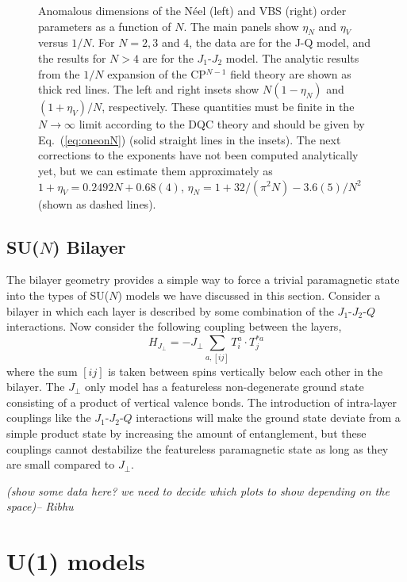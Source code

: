\documentclass[range]{ar2e}
\begin{document}
\begin{figure}
  \caption{ \label{fig:exp} Anomalous dimensions of the N\'eel (left)
    and VBS (right)
  order parameters as a function of $N$. The main panels show $\eta_N$ and $\eta_V$ versus $1/N$. For $N=2,3$ and $4$, the data are 
  for the J-Q model, and the results for $N>4$ are for the $J_1$-$J_2$ model. The analytic results 
  from the $1/N$ expansion of the CP$^{N-1}$ field theory are shown as thick red lines. The left and right insets 
  show $N(1-\eta_N)$ and $(1+\eta_V)/N$, respectively. These quantities must be finite in the  $N\rightarrow \infty$ 
  limit according to the DQC theory and should be given by Eq.~(\ref{eq:oneonN}) (solid straight lines in the insets). 
  The next corrections to the exponents have not been computed analytically yet, but we can estimate them approximately 
  as $1+\eta_V = 0.2492 N + 0.68(4)$, $\eta_N = 1+32/(\pi^2 N)-3.6(5)/N^2$ (shown as dashed lines).}
\end{figure}

\subsection{SU($N$) Bilayer}
\label{ss:bilN}

The bilayer geometry provides a simple way to force a trivial paramagnetic
state into the types of SU($N$) models we have discussed in this
section. Consider a bilayer in which each layer is described by some
combination of the $J_1$-$J_2$-$Q$ interactions. Now consider the
following coupling between the layers,
\begin{equation}
 H_{J_\perp} = -J_\perp \sum_{a,[ij]} T^a_i\cdot T^{*a}_j
\end{equation}
where the sum $[ij]$ is taken between spins vertically below each other
in the bilayer. The $J_\perp$ only model has a featureless non-degenerate ground state
consisting of a product of vertical valence bonds. The introduction of intra-layer couplings like the $J_1$-$J_2$-$Q$ interactions will
make the ground state deviate from a simple product state by
increasing the amount of entanglement, but these couplings
 cannot destabilize the featureless paramagnetic
state as long as they are small compared to $J_\perp$. 

{\em (show some data here? we need to decide which plots to show
  depending on the space)-- Ribhu}

\section{U(1) models}
\label{sec:u1models}
\end{document}
